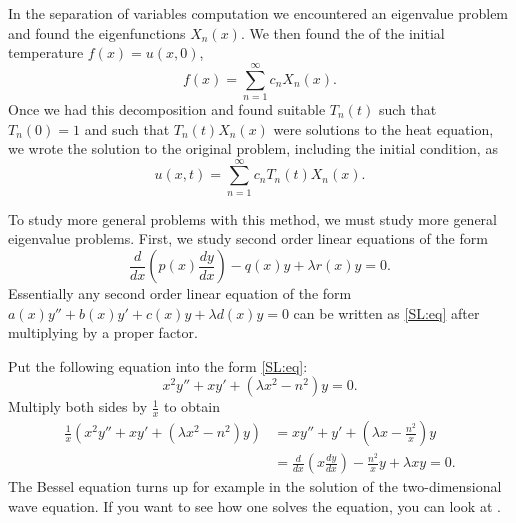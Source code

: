 In the separation of variables computation
we encountered an eigenvalue problem and found the
eigenfunctions
$X_n(x)$.  We then found the \emph{} of
the initial
temperature $f(x) = u(x,0)$,
\begin{equation*}
f(x) = \sum_{n=1}^\infty c_n X_n(x) .
\end{equation*}
Once we had this decomposition
and found suitable $T_n(t)$ such that $T_n(0) = 1$
and such that $T_n(t)X_n(x)$ were solutions to the heat equation,
we wrote the solution to the original problem, including the initial
condition, as
\begin{equation*}
u(x,t) = \sum_{n=1}^\infty c_n T_n(t) X_n(x) .
\end{equation*}

\medskip

To study more general problems with this method, we must study
more general eigenvalue problems.
First, we study 
second order linear equations of the form
\begin{equation} \label{SL:eq}
\frac{d}{dx} \left( p(x) \frac{dy}{dx} \right)
- q(x) y + \lambda r(x) y = 0 .
\end{equation}
Essentially
any second order linear equation
of the form $a(x) y'' + b(x) y' + c(x) y + \lambda d(x) y = 0$
can be written as \eqref{SL:eq}
after multiplying by a proper factor.

\begin{example}[Bessel]
Put the following equation into the form \eqref{SL:eq}:
\begin{equation*}
x^2 y'' + xy' + \left(\lambda x^2 - n^2\right)y = 0 .
\end{equation*}
Multiply both sides by $\frac{1}{x}$ to obtain
\begin{equation*}
\begin{split}
\frac{1}{x} \left( x^2 y'' + xy' + \left(\lambda x^2 - n^2\right)y \right)
& =
x y'' + y' + \left(\lambda x - \frac{n^2}{x}\right)y 
\\
& =
\frac{d}{dx} \left( x \frac{dy}{dx} \right)
- \frac{n^2}{x} y + \lambda x y  = 0.
\end{split}
\end{equation*}
The Bessel equation turns up for example in the solution of
the two-dimensional wave equation.
If you want to see how one solves the equation,
you can look at .
\end{example}

